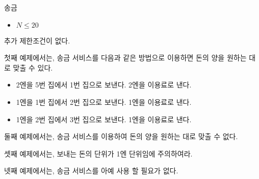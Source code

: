 \begin{problem}{송금}
	\begin{itemize}
		\item $N \le 20$
	\end{itemize}
	
	
	추가 제한조건이 없다.
		
	\Examples
		
	\begin{example}
	\end{example}
	
	\Notes
	
	첫째 예제에서는, 송금 서비스를 다음과 같은 방법으로 이용하면 돈의 양을 원하는 대로 맞출 수 있다.
	
	\begin{itemize}
		\item 2엔을 5번 집에서 1번 집으로 보낸다. 2엔을 이용료로 낸다.
		\item 1엔을 1번 집에서 2번 집으로 보낸다. 1엔을 이용료로 낸다.
		\item 1엔을 2번 집에서 3번 집으로 보낸다. 1엔을 이용료로 낸다.
	\end{itemize}

	둘째 예제에서는, 송금 서비스를 이용하여 돈의 양을 원하는 대로 맞출 수 없다.
	
	셋째 예제에서는, 보내는 돈의 단위가 1엔 단위임에 주의하여라.
	
	넷째 예제에서는, 송금 서비스를 아예 사용 할 필요가 없다.
	
	
	
\end{problem}

